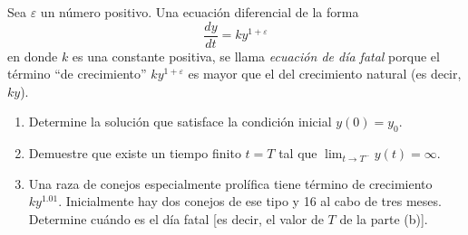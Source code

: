 \item Sea $\varepsilon$ un número positivo. Una ecuación diferencial de la forma
    \[ \frac{dy}{dt} = ky^{1+\varepsilon} \]
    en donde $k$ es una constante positiva, se llama \textit{ecuación de día fatal} porque el término ``de crecimiento'' $ky^{1+\varepsilon}$ es mayor que el del crecimiento natural (es decir, $ky$).
    \begin{enumerate}
        \item[(a)] Determine la solución que satisface la condición inicial $y(0) = y_0$.
        \item[(b)] Demuestre que existe un tiempo finito $t = T$ tal que $\lim_{t \to T^-} y(t) = \infty$.
        \item[(c)] Una raza de conejos especialmente prolífica tiene término de crecimiento $ky^{1.01}$. Inicialmente hay dos conejos de ese tipo y 16 al cabo de tres meses. Determine cuándo es el día fatal [es decir, el valor de $T$ de la parte (b)].
    \end{enumerate}
